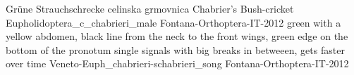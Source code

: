 {Grüne Strauchschrecke} %
{celinska grmovnica} %
{Chabrier's Bush-cricket} %
{Eupholidoptera_c_chabrieri_male} {Fontana-Orthoptera-IT-2012} %
{} %
{green with a yellow abdomen, black line from the neck to the front wings, green edge on the bottom of the pronotum} %
{single signals with big breaks in betweeen, gets faster over time} %
{Veneto-Euph_chabrieri-schabrieri_song} {Fontana-Orthoptera-IT-2012} %